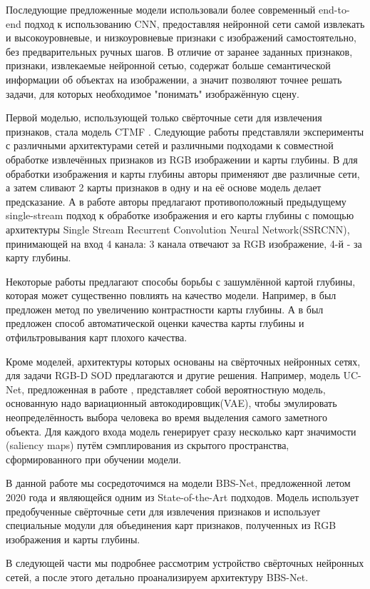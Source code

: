 Последующие предложенные модели использовали более современный end-to-end подход к использованию CNN, предоставляя нейронной сети самой извлекать 
и высокоуровневые, и низкоуровневые признаки с изображений самостоятельно, без предварительных ручных шагов.
В отличие от заранее заданных признаков, признаки, извлекаемые нейронной сетью, содержат больше семантической информации об объектах на изображении, а значит
позволяют точнее решать задачи, для которых необходимое "понимать" изображённую сцену. 

Первой моделью, использующей только свёрточные сети для извлечения признаков, стала модель CTMF \cite{CNNs-Based}. 
Следующие работы представляли эксперименты с различными архитектурами сетей и различными подходами 
к совместной обработке извлечённых признаков из RGB изображении и карты глубины. В \cite{Progressively} для обработки 
изображения и карты глубины авторы применяют две различные сети, а затем сливают 2 карты признаков в одну и 
на её основе модель делает предсказание. А в работе \cite{Single-Stream} авторы предлагают противоположный предыдущему 
single-stream подход к обработке изображения и его карты глубины с помощью архитектуры Single Stream Recurrent Convolution Neural Network(SSRCNN),
принимающей на вход 4 канала: 3 канала отвечают за RGB изображение, 4-й - за карту глубины.

Некоторые работы предлагают способы борьбы с зашумлённой картой глубины, которая может существенно повлиять на качество модели.
Например, в \cite{Contrast} был предложен метод по увеличению контрастности карты глубины. А в \cite{Rethinking-RGBD} был предложен 
способ автоматической оценки качества карты глубины и отфильтровывания карт плохого качества.

Кроме моделей, архитектуры которых основаны на свёрточных нейронных сетях, для задачи RGB-D SOD предлагаются и другие решения. 
Например, модель UC-Net, предложенная в работе \cite{UC-Net}, представляет собой вероятностную модель, основанную надо
вариационный автокодировщик(VAE), чтобы эмулировать неопределённость выбора человека во время выделения самого заметного объекта.
Для каждого входа модель генерирует сразу несколько карт значимости (saliency maps) путём сэмплирования из скрытого пространства,
сформированного при обучении модели.


В данной работе мы сосредоточимся на модели BBS-Net\cite{BBS}, предложенной летом 2020 года и являющейся одним из State-of-the-Art подходов.
Модель использует предобученные свёрточные сети для извлечения признаков и использует специальные модули для объединения карт признаков,
полученных из RGB изображения и карты глубины. 

В следующей части мы подробнее рассмотрим устройство свёрточных нейронных сетей, а после этого детально проанализируем архитектуру BBS-Net\cite{BBS}.